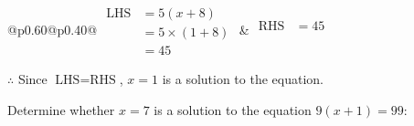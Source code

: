 \documentclass[12pt]{article}
\newcounter{minipagecount}
\begin{document}
\begin{multicols}{2}
\begin{minipage}[t]{0.40\textwidth}
    \renewcommand{\arraystretch}{1.3} %
    \begin{tabular}{@{}p{0.60\linewidth}@{}p{0.40\linewidth}@{}}
        \(\begin{aligned}
            \text{LHS} &= 5(x + 8) \\
                    &= 5 \times(1 + 8) \\
                    &= 45
        \end{aligned}\) &
        \(\begin{aligned}
            \text{RHS} &= 45\\
                    & \\
                    &
        \end{aligned}\)
    \end{tabular}
    \renewcommand{\arraystretch}{1.0} %
    \vspace{2pt}  %

    \noindent \(\therefore\) Since \(\text{LHS} = \text{RHS}\), \(x = 1\) is  a solution to the equation.

\end{minipage}

 \vspace*{16pt}
\noindent{(\theminipagecount)}\hspace{0.1mm} %
\begin{minipage}[t]{0.40\textwidth} %

    \noindent Determine whether \(x = 7\) is a solution to the equation \(9(x + 1) = 99\):
    \vspace{4pt}  %

    \noindent


\end{minipage}
\end{multicols}
\end{document}
